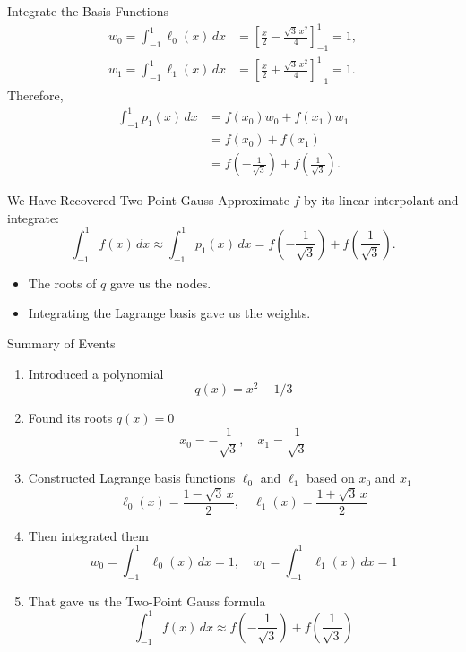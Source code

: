 \documentclass[10pt]{beamer}
\begin{document}
\begin{frame}{Integrate the Basis Functions}
\begin{align*}
    w_0=\int_{-1}^1\ell_0(x)\,dx
    &=\left[\frac{x}{2}-\frac{\sqrt3\,x^2}{4}\right]_{-1}^1=1,\\[3mm]
    w_1=\int_{-1}^1\ell_1(x)\,dx
    &=\left[\frac{x}{2}+\frac{\sqrt3\,x^2}{4}\right]_{-1}^1=1.
\end{align*}
Therefore,
\begin{align*}
\int_{-1}^1p_1(x)\,dx &=f(x_0)w_0+f(x_1)w_1\\
&=f(x_0)+f(x_1)\\
&=f\left(-\frac1{\sqrt3}\right)+f\left(\frac1{\sqrt3}\right).
\end{align*}
\end{frame}

\begin{frame}{We Have Recovered Two-Point Gauss}
Approximate $f$ by its linear interpolant and integrate:
\[
    \int_{-1}^1 f(x)\,dx
    \approx\int_{-1}^1p_1(x)\,dx
    =f\left(-\frac1{\sqrt3}\right)+f\left(\frac1{\sqrt3}\right).
\]
\begin{itemize}
    \item The roots of $q$ gave us the nodes.
    \item Integrating the Lagrange basis gave us the weights.
\end{itemize}
\end{frame}


\begin{frame}{Summary of Events}

\begin{enumerate}
    \item Introduced a polynomial $$q(x)=x^2-1/3$$

    \item<2-> Found its roots $q(x)=0$
    $$
        x_{0} = -\frac{1}{\sqrt{3}},\quad  x_{1} = \frac{1}{\sqrt{3}}
    $$
    \item<3-> Constructed Lagrange basis functions $\ell_0$ and $\ell_1$ based on $x_0$ and $x_1$
    $$
        \ell_0(x)=\frac{1-\sqrt3\,x}{2},\quad 
    \ell_1(x)
    =\frac{1+\sqrt3\,x}{2}
    $$
    \item<4-> Then integrated them 
    $$
    w_0=\int_{-1}^1\ell_0(x)\,dx=1,\quad 
    w_1=\int_{-1}^1\ell_1(x)\,dx=1
    $$
    \item<5-> That gave us the Two-Point Gauss formula 
    \[
        \int_{-1}^1 f(x)\,dx
        \approx f\left(-\frac1{\sqrt3}\right)+f\left(\frac1{\sqrt3}\right)
    \]
\end{enumerate}
    
\end{frame}
\end{document}
